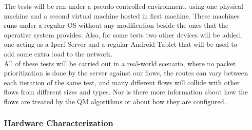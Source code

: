 The tests will be ran under a pseudo controlled environment, using one physical 
machine and a second virtual machine hosted in first machine. These machines 
runs under a regular OS without any modification beside the ones that the 
operative system provides. Also, for some tests two other devices will be added, 
one acting as a Iperf Server and a regular Android Tablet that will be used to 
add some extra load to the network.\\

All of these tests will be carried out in a real-world scenario, where no packet 
prioritization is done by the server against our flows, the routes can vary
between each iteration of the same test, and many different flows will collide
with other flows from different sizes and types. Nor is there more information 
about how the flows are treated by the QM algorithms or about how they are 
configured.\\

\subsubsection{Hardware Characterization}

